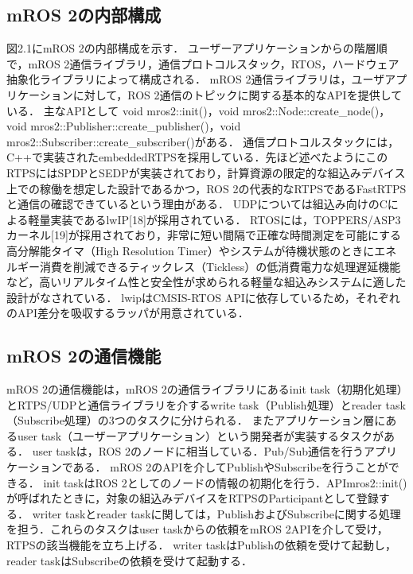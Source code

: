 \subsection{mROS 2の内部構成}
図2.1にmROS 2の内部構成を示す．
ユーザーアプリケーションからの階層順で，mROS 2通信ライブラリ，通信プロトコルスタック，RTOS，ハードウェア抽象化ライブラリによって構成される．
mROS 2通信ライブラリは，ユーザアプリケーションに対して，ROS 2通信のトピックに関する基本的なAPIを提供している．
主なAPIとして void mros2::init()，void mros2::Node::create\_node()，void mros2::Publisher::create\_publisher()，void mros2::Subscriber::create\_subscriber()がある．
通信プロトコルスタックには，C++で実装されたembeddedRTPSを採用している．先ほど述べたようにこのRTPSにはSPDPとSEDPが実装されており，計算資源の限定的な組込みデバイス上での稼働を想定した設計であるかつ，ROS 2の代表的なRTPSであるFastRTPSと通信の確認できているという理由がある．
UDPについては組込み向けのCによる軽量実装であるlwIP[18]が採用されている．
RTOSには，TOPPERS/ASP3カーネル[19]が採用されており，非常に短い間隔で正確な時間測定を可能にする高分解能タイマ（High Resolution Timer）やシステムが待機状態のときにエネルギー消費を削減できるティックレス（Tickless）の低消費電力な処理遅延機能など，高いリアルタイム性と安全性が求められる軽量な組込みシステムに適した設計がなされている．
lwipはCMSIS-RTOS APIに依存しているため，それぞれのAPI差分を吸収するラッパが用意されている．
\subsection{mROS 2の通信機能}
mROS 2の通信機能は，mROS 2の通信ライブラリにあるinit task（初期化処理）とRTPS/UDPと通信ライブラリを介するwrite task（Publish処理）とreader task（Subscribe処理）の3つのタスクに分けられる．
またアプリケーション層にあるuser task（ユーザーアプリケーション）という開発者が実装するタスクがある．
user taskは，ROS 2のノードに相当している．Pub/Sub通信を行うアプリケーションである．
mROS 2のAPIを介してPublishやSubscribeを行うことができる．
init taskはROS 2としてのノードの情報の初期化を行う．APImros2::init()が呼ばれたときに，対象の組込みデバイスをRTPSのParticipantとして登録する．
writer taskとreader taskに関しては，PublishおよびSubscribeに関する処理を担う．これらのタスクはuser taskからの依頼をmROS 2APIを介して受け，RTPSの該当機能を立ち上げる．
writer taskはPublishの依頼を受けて起動し，reader taskはSubscribeの依頼を受けて起動する．

